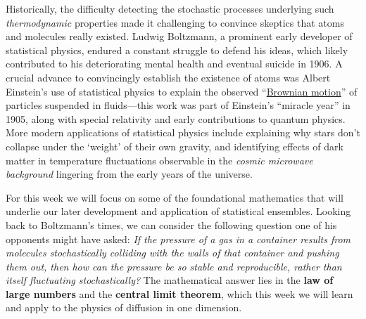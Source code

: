 \documentclass[12 pt]{article}
\begin{document}
Historically, the difficulty detecting the stochastic processes underlying such \textit{thermodynamic} properties made it challenging to convince skeptics that atoms and molecules really existed.
Ludwig Boltzmann, a prominent early developer of statistical physics, endured a constant struggle to defend his ideas, which likely contributed to his deteriorating mental health and eventual suicide in 1906.
A crucial advance to convincingly establish the existence of atoms was Albert Einstein's use of statistical physics to explain the observed ``\href{https://en.wikipedia.org/wiki/Brownian_motion}{Brownian motion}'' of particles suspended in fluids---this work was part of Einstein's ``miracle year'' in 1905, along with special relativity and early contributions to quantum physics.
More modern applications of statistical physics include explaining why stars don't collapse under the `weight' of their own gravity, and identifying effects of dark matter in temperature fluctuations observable in the \textit{cosmic microwave background} lingering from the early years of the universe.

For this week we will focus on some of the foundational mathematics that will underlie our later development and application of statistical ensembles.
Looking back to Boltzmann's times, we can consider the following question one of his opponents might have asked:
\textit{If the pressure of a gas in a container results from molecules stochastically colliding with the walls of that container and pushing them out, then how can the pressure be so stable and reproducible, rather than itself fluctuating stochastically?}
The mathematical answer lies in the \textbf{law of large numbers} and the \textbf{central limit theorem}, which this week we will learn and apply to the physics of diffusion in one dimension.



\end{document}
